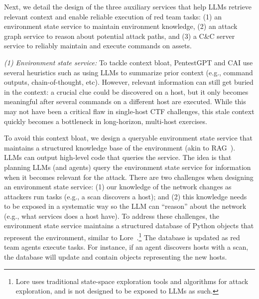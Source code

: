 Next, we detail the design of the three auxiliary services that help LLMs retrieve relevant context and enable reliable execution of red team tasks: (1) an environment state service to maintain environment knowledge, (2) an attack graph service to reason about potential attack paths, and (3) a C\&C server service to reliably maintain and execute commands on assets.


\emph{(1) Environment state service:} To  tackle  context bloat,
PentestGPT and CAI use several heuristics such as using LLMs to summarize prior context (e.g., command outputs, chain-of-thought, etc). However,  relevant  information can still get buried in the context: a crucial clue could be discovered on a host, but it only becomes meaningful after several commands on a different host are executed.
While this may not have been a critical flaw in  single-host CTF challenges,  this  stale context quickly becomes a bottleneck in long-horizon, multi-host exercises.

To avoid this context bloat, we design a queryable environment state service that maintains a structured knowledge base of the environment (akin to RAG~\cite{lewis2020retrieval}).
LLMs can output high-level code   that queries the service.
The idea is that planning LLMs (and agents) query the environment state service for information when it becomes relevant for the attack.
There are two challenges when designing an environment state service: (1) our knowledge of the network changes as attackers run tasks (e.g., a scan discovers a host);  and (2) this knowledge needs to be exposed in a systematic way so the LLM can ``reason'' about the network (e.g., what services does a host have).
To address these challenges, the environment state service maintains a structured database of Python objects that represent the environment, similar to Lore~\cite{holm2022lore}.\footnote{Lore uses traditional state-space exploration tools and algorithms for attack exploration, and is not designed to be exposed to LLMs as such.}
The database is updated as red team agents execute tasks.
For instance, if an agent discovers hosts with a scan, the database will update and contain objects representing the new hosts.



